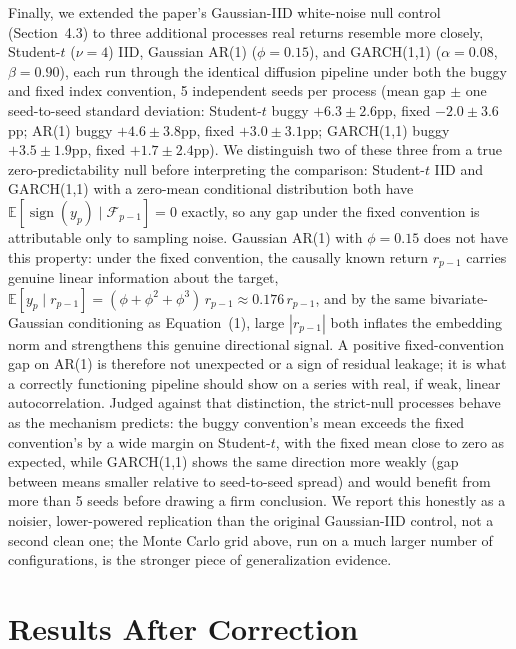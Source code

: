 \documentclass[preprint,12pt]{elsarticle}
\begin{document}
Finally, we extended the paper's Gaussian-IID white-noise null control (Section~4.3) to three
additional processes real returns resemble more closely, Student-$t$ ($\nu=4$) IID, Gaussian
AR(1) ($\phi=0.15$), and GARCH(1,1) ($\alpha=0.08$, $\beta=0.90$), each run through the identical
diffusion pipeline under both the buggy and fixed index convention, 5 independent seeds per
process (mean gap $\pm$ one seed-to-seed standard deviation: Student-$t$ buggy $+6.3\pm2.6$pp,
fixed $-2.0\pm3.6$pp; AR(1) buggy $+4.6\pm3.8$pp, fixed $+3.0\pm3.1$pp; GARCH(1,1) buggy
$+3.5\pm1.9$pp, fixed $+1.7\pm2.4$pp). We distinguish two of these three from a true
zero-predictability null before interpreting the comparison: Student-$t$ IID and GARCH(1,1) with
a zero-mean conditional distribution both have $\mathbb{E}[\operatorname{sign}(y_p) \mid
\mathcal{F}_{p-1}] = 0$ exactly, so any gap under the fixed convention is attributable only to
sampling noise. Gaussian AR(1) with $\phi=0.15$ does not have this property: under the fixed
convention, the causally known return $r_{p-1}$ carries genuine linear information about the
target, $\mathbb{E}[y_p \mid r_{p-1}] = (\phi+\phi^2+\phi^3)\,r_{p-1} \approx 0.176\,r_{p-1}$,
and by the same bivariate-Gaussian conditioning as Equation~(1), large $|r_{p-1}|$ both inflates
the embedding norm and strengthens this genuine directional signal. A positive fixed-convention
gap on AR(1) is therefore not unexpected or a sign of residual leakage; it is what a correctly
functioning pipeline should show on a series with real, if weak, linear autocorrelation. Judged
against that distinction, the strict-null processes behave as the mechanism predicts: the buggy
convention's mean exceeds the fixed convention's by a wide margin on Student-$t$, with the fixed
mean close to zero as expected, while GARCH(1,1) shows the same direction more weakly (gap
between means smaller relative to seed-to-seed spread) and would benefit from more than 5 seeds
before drawing a firm conclusion. We report this honestly as a noisier, lower-powered replication
than the original Gaussian-IID control, not a second clean one; the Monte Carlo grid above, run
on a much larger number of configurations, is the stronger piece of generalization evidence.

\section{Results After Correction}
\end{document}
